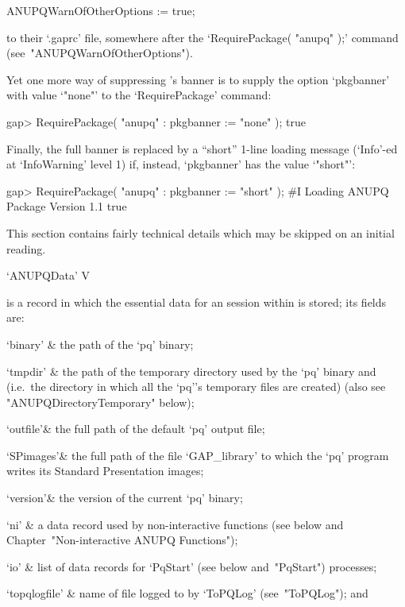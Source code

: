 \begintt
ANUPQWarnOfOtherOptions := true;
\endtt

to their `.gaprc' file, somewhere after the  `RequirePackage( "anupq" );'
command (see~"ANUPQWarnOfOtherOptions").

Yet one more way of suppressing {\ANUPQ}'s banner is to supply the option
`pkgbanner' with value `"none"' to the `RequirePackage' command:

\beginexample
gap> RequirePackage( "anupq" : pkgbanner := "none" );
true
\endexample

Finally, the full banner  is  replaced  by  a  ``short''  1-line  loading
message (`Info'-ed at `InfoWarning' level 1) if, instead, `pkgbanner' has
the value `"short"':

\begintt
gap> RequirePackage( "anupq" : pkgbanner := "short" );
#I  Loading ANUPQ Package Version 1.1
true
\endtt


This section contains fairly technical details which may be skipped on an
initial reading.

\>`ANUPQData' V

is a {\GAP} record in which the essential data for  an  {\ANUPQ}  session
within {\GAP} is stored; its fields are:

\beginitems

\quad`binary' & the path of the `pq' binary;

\quad`tmpdir' & the path of the temporary  directory  used  by  the  `pq'
binary and {\GAP} (i.e.~the directory in which all the  `pq''s  temporary
files are created) (also see "ANUPQDirectoryTemporary" below);

\quad`outfile'& the full path of the default `pq' output  file;

\quad`SPimages'& the full path of the file  `GAP_library'  to  which  the
`pq' program writes its Standard Presentation images;

\quad`version'& the version of the current `pq' binary;

\quad`ni' & a data record used by non-interactive  functions  (see  below
and Chapter~"Non-interactive ANUPQ Functions");

\quad`io' & list of data records for `PqStart' (see below  and~"PqStart")
processes;

\quad`topqlogfile' & name of file logged to by `ToPQLog' (see~"ToPQLog");
and

